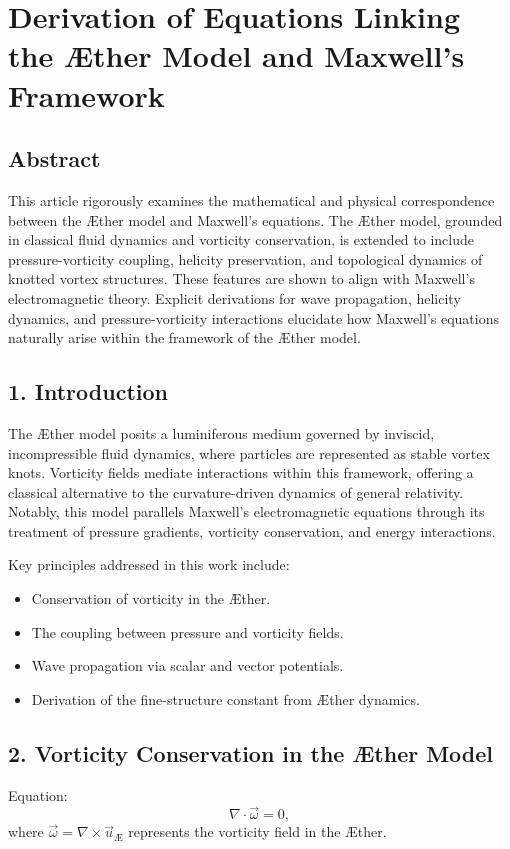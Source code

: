 

        \section{Derivation of Equations Linking the Æther Model and Maxwell's Framework}

        \subsection*{Abstract}
        This article rigorously examines the mathematical and physical correspondence between the Æther model and Maxwell's equations. The Æther model, grounded in classical fluid dynamics and vorticity conservation, is extended to include pressure-vorticity coupling, helicity preservation, and topological dynamics of knotted vortex structures. These features are shown to align with Maxwell's electromagnetic theory. Explicit derivations for wave propagation, helicity dynamics, and pressure-vorticity interactions elucidate how Maxwell's equations naturally arise within the framework of the Æther model.

        \subsection*{1. Introduction}
        The Æther model posits a luminiferous medium governed by inviscid, incompressible fluid dynamics, where particles are represented as stable vortex knots. Vorticity fields mediate interactions within this framework, offering a classical alternative to the curvature-driven dynamics of general relativity. Notably, this model parallels Maxwell's electromagnetic equations through its treatment of pressure gradients, vorticity conservation, and energy interactions.

        Key principles addressed in this work include:
        \begin{itemize}
            \item Conservation of vorticity in the Æther.
            \item The coupling between pressure and vorticity fields.
            \item Wave propagation via scalar and vector potentials.
            \item Derivation of the fine-structure constant from Æther dynamics.
        \end{itemize}

        \subsection*{2. Vorticity Conservation in the Æther Model}
        Equation:
        \begin{equation*}
            \nabla \cdot \vec{\omega} = 0,
        \end{equation*}
        where $\vec{\omega} = \nabla \times \vec{u}_\text{Æ}$ represents the vorticity field in the Æther.

